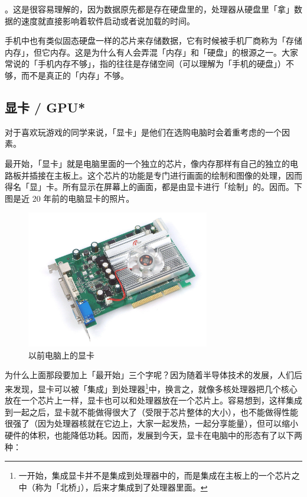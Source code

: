 。这是很容易理解的，因为数据原先都是存在硬盘里的，处理器从硬盘里「拿」数据的速度就直接影响着软件启动或者说加载的时间。

\begin{note}
  手机中也有类似固态硬盘一样的芯片来存储数据，它有时候被手机厂商称为「存储内存」，但它内存。这是为什么有人会弄混「内存」和「硬盘」的根源之一。大家常说的「手机内存不够」，指的往往是存储空间（可以理解为「手机的硬盘」）不够，而不是真正的「内存」不够。
\end{note}

\subsection{显卡 / GPU*}

对于喜欢玩游戏的同学来说，「显卡」是他们在选购电脑时会着重考虑的一个因素。

最开始，「显卡」就是电脑里面的一个独立的芯片，像内存那样有自己的独立的电路板并插接在主板上。这个芯片的功能是专门进行画面的绘制和图像的处理，因而得名「显」卡。所有显示在屏幕上的画面，都是由显卡进行「绘制」的。因而。下图是近 20 年前的电脑显卡的照片。

\begin{figure}[H]
  \centering
  \includegraphics[width=8cm]{assets/Old_GPU.png}
  \caption{以前电脑上的显卡}
  \label{old-gpu}
\end{figure}

为什么上面那段要加上「最开始」三个字呢？因为随着半导体技术的发展，人们后来发现，显卡可以被「集成」到处理器\footnote{一开始，集成显卡并不是集成到处理器中的，而是集成在主板上的一个芯片之中（称为「北桥」），后来才集成到了处理器里面。}中，换言之，就像多核处理器把几个核心放在一个芯片上一样，显卡也可以和处理器放在一个芯片上。容易想到，这样集成到一起之后，显卡就不能做得很大了（受限于芯片整体的大小），也不能做得性能很强了（因为处理器核就在它边上，大家一起发热，一起分享能量），但可以缩小硬件的体积，也能降低功耗。因而，发展到今天，显卡在电脑中的形态有了以下两种：

